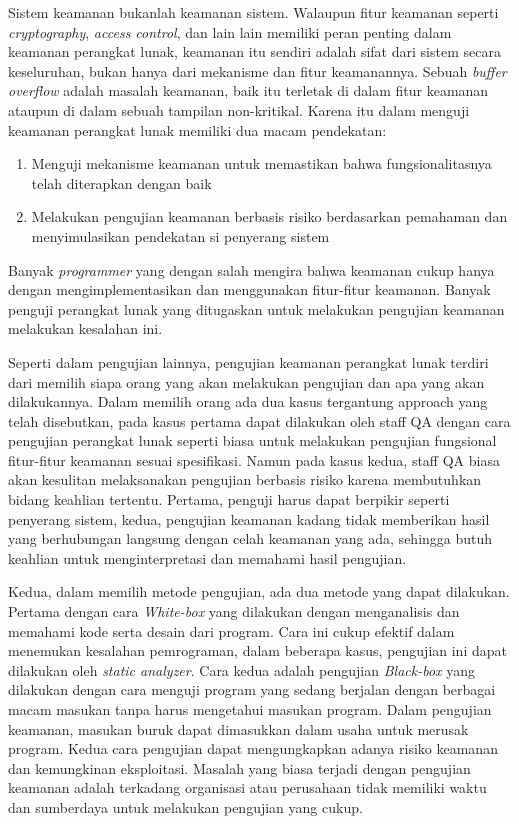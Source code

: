 Sistem keamanan bukanlah keamanan sistem. Walaupun fitur keamanan seperti \textit{cryptography},
\textit{access control}, dan lain lain memiliki peran penting dalam keamanan perangkat lunak,
keamanan itu sendiri adalah sifat dari sistem secara keseluruhan, bukan hanya dari mekanisme
dan fitur keamanannya. Sebuah \textit{buffer overflow} adalah masalah keamanan, baik itu terletak di dalam
fitur keamanan ataupun di dalam sebuah tampilan non-kritikal.
Karena itu dalam menguji keamanan perangkat lunak memiliki dua macam pendekatan:

\begin{enumerate}
    \item Menguji mekanisme keamanan untuk memastikan bahwa fungsionalitasnya telah diterapkan dengan baik
    \item Melakukan pengujian keamanan berbasis risiko berdasarkan pemahaman dan menyimulasikan pendekatan si penyerang sistem
\end{enumerate}

Banyak \textit{programmer} yang dengan salah mengira bahwa keamanan cukup hanya dengan mengimplementasikan dan
menggunakan fitur-fitur keamanan. Banyak penguji perangkat lunak yang ditugaskan untuk melakukan
pengujian keamanan melakukan kesalahan ini.

Seperti dalam pengujian lainnya, pengujian keamanan perangkat lunak terdiri dari memilih
siapa orang yang akan melakukan pengujian dan apa yang akan dilakukannya.
Dalam memilih orang ada dua kasus tergantung approach yang telah disebutkan,
pada kasus pertama dapat dilakukan oleh staff QA dengan cara pengujian
perangkat lunak seperti biasa untuk melakukan pengujian fungsional
fitur-fitur keamanan sesuai spesifikasi.
Namun pada kasus kedua, staff QA biasa akan kesulitan melaksanakan pengujian berbasis risiko
karena membutuhkan bidang keahlian tertentu.
Pertama, penguji harus dapat berpikir seperti penyerang sistem,
kedua, pengujian keamanan kadang tidak memberikan hasil yang berhubungan langsung dengan
celah keamanan yang ada, sehingga butuh keahlian untuk menginterpretasi dan memahami hasil pengujian.

Kedua, dalam memilih metode pengujian, ada dua metode yang dapat dilakukan.
Pertama dengan cara \textit{White-box} yang dilakukan dengan menganalisis dan memahami
kode serta desain dari program.
Cara ini cukup efektif dalam menemukan kesalahan pemrograman,
dalam beberapa kasus, pengujian ini dapat dilakukan oleh \textit{static analyzer}.
Cara kedua adalah pengujian \textit{Black-box} yang dilakukan dengan cara menguji program
yang sedang berjalan dengan berbagai macam masukan tanpa harus mengetahui masukan program.
Dalam pengujian keamanan, masukan buruk dapat dimasukkan dalam usaha untuk merusak program.
Kedua cara pengujian dapat mengungkapkan adanya risiko keamanan dan kemungkinan eksploitasi.
Masalah yang biasa terjadi dengan pengujian keamanan adalah terkadang organisasi atau perusahaan
tidak memiliki waktu dan sumberdaya untuk melakukan pengujian yang cukup.

